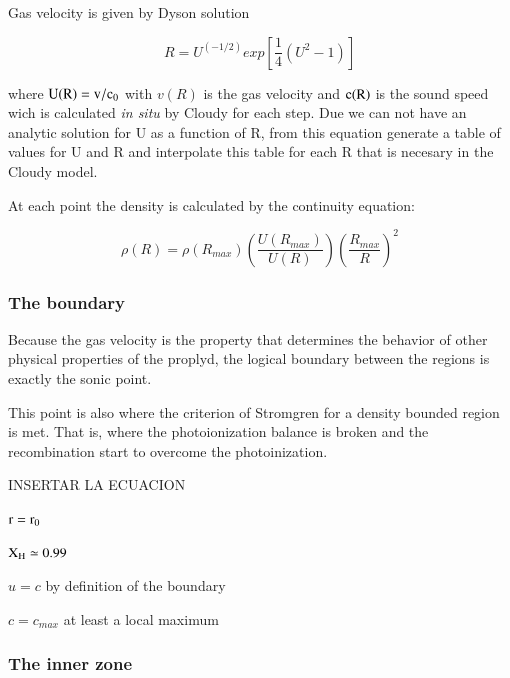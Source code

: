 \documentclass[aaspp]{article}
\begin{document}
Gas velocity is given by Dyson solution \citep{1968Ap&SS...1..388D}

\begin{equation}
  R = U^{(-1/2)} exp \left [ \frac{1}{4} \left (U^2 -1 \right )
  \right ]
\end{equation}

where $\rm U(R) = v / c_0$ with $v(R)$ is the gas velocity and
$\rm c(R)$ is the sound speed wich is calculated {\it in situ} by Cloudy
for each step.
Due we can not have an analytic solution for U as a function of R,
from this equation generate a table of values for U and R and
interpolate this table for each R that is necesary in the Cloudy model.

At each point the density is calculated by the continuity equation:

\begin{equation}
  \rho (R) = \rho (R_{max}) \left ( \frac{U(R_{max})}{U (R)} \right )
    \left ( \frac{R_{max}}{R} \right ) ^2
\end{equation}

\subsubsection{The boundary}
\label{sec:boundary}

Because the gas velocity is the property that determines the behavior
of other physical properties of the proplyd, the logical boundary
between the regions is exactly the sonic point.

This point is also where the criterion of Stromgren for a density
bounded region is met. That is, where the photoionization balance is
broken and the recombination start to overcome the photoinization.

INSERTAR LA ECUACION

$\rm r = r_0$

$\rm X_H \simeq 0.99$

$u = c$ by definition of the boundary

$c = c_{max}$ at least a local maximum 

\subsubsection{The inner zone}
\label{sec:inner}
\end{document}
